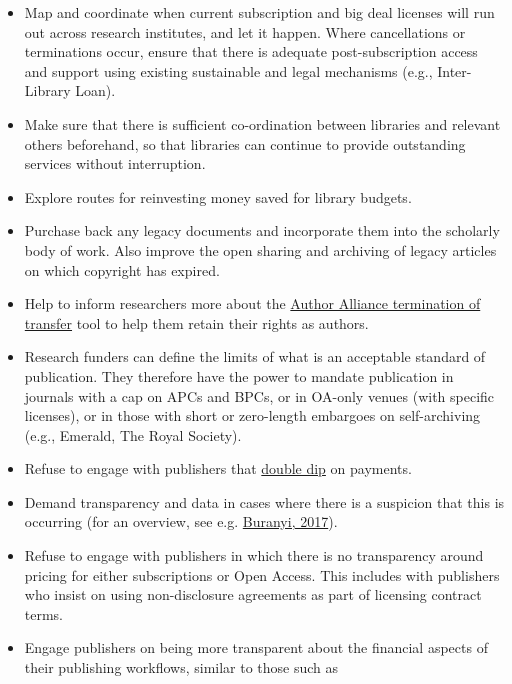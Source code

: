 \begin{itemize}
\item
  Map and coordinate when current subscription and big deal licenses
  will run out across research institutes, and let it happen. Where
  cancellations or terminations occur, ensure that there is adequate
  post-subscription access and support using existing sustainable and
  legal mechanisms (e.g., Inter-Library Loan).
\item
  Make sure that there is sufficient co-ordination between libraries and
  relevant others beforehand, so that libraries can continue to provide
  outstanding services without interruption.
\item
  Explore routes for reinvesting money saved for library budgets.
\item
  Purchase back any legacy documents and incorporate them into the
  scholarly body of work. Also improve the open sharing and archiving of
  legacy articles on which copyright has expired.
\item
  Help to inform researchers more about the
  \href{https://www.authorsalliance.org/resources/termination-of-transfer/}{Author
  Alliance termination of transfer} tool to help them retain their
  rights as authors.
\item
  Research funders can define the limits of what is an acceptable
  standard of publication. They therefore have the power to mandate
  publication in journals with a cap on APCs and BPCs, or in OA-only
  venues (with specific licenses), or in those with short or zero-length
  embargoes on self-archiving (e.g., Emerald, The Royal Society).
\item
  Refuse to engage with publishers that
  \href{http://www.rluk.ac.uk/about-us/blog/the-costs-of-double-dipping/}{double
  dip} on payments.
\item
  Demand transparency and data in cases where there is a suspicion that
  this is occurring (for an overview, see e.g.
  \href{https://www.theguardian.com/science/2017/jun/27/profitable-business-scientific-publishing-bad-for-science}{Buranyi,
  2017}).
\item
  Refuse to engage with publishers in which there is no transparency
  around pricing for either subscriptions or Open Access. This includes
  with publishers who insist on using non-disclosure agreements as part
  of licensing contract terms.
\item
  Engage publishers on being more transparent about the financial
  aspects of their publishing workflows, similar to those such as

\end{itemize}
